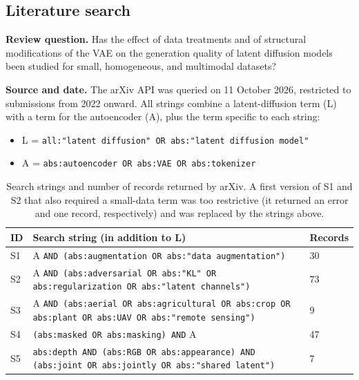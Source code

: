
\subsection{Literature search}

\textbf{Review question.} Has the effect of data treatments and of structural modifications of the VAE on the generation quality of latent diffusion models been studied for small, homogeneous, and multimodal datasets?

\textbf{Source and date.} The arXiv API was queried on 11 October 2026, restricted to submissions from 2022 onward. All strings combine a latent-diffusion term (L) with a term for the autoencoder (A), plus the term specific to each string:
\begin{itemize}
  \item L = \texttt{all:"latent diffusion" OR abs:"latent diffusion model"}
  \item A = \texttt{abs:autoencoder OR abs:VAE OR abs:tokenizer}
\end{itemize}

\begin{table}[h]
\centering
\small
\begin{tabular}{p{}p{}p{}}
\hline
\textbf{ID} & \textbf{Search string (in addition to L)} & \textbf{Records} \\
\hline
S1 & A \texttt{AND (abs:augmentation OR abs:"data augmentation")} & 30 \\
S2 & A \texttt{AND (abs:adversarial OR abs:"KL" OR abs:regularization OR abs:"latent channels")} & 73 \\
S3 & A \texttt{AND (abs:aerial OR abs:agricultural OR abs:crop OR abs:plant OR abs:UAV OR abs:"remote sensing")} & 9 \\
S4 & \texttt{(abs:masked OR abs:masking) AND} A & 47 \\
S5 & \texttt{abs:depth AND (abs:RGB OR abs:appearance) AND (abs:joint OR abs:jointly OR abs:"shared latent")} & 7 \\
\hline
\end{tabular}
\caption{Search strings and number of records returned by arXiv. A first version of S1 and S2 that also required a small-data term was too restrictive (it returned an error and one record, respectively) and was replaced by the strings above.}
\end{table}

